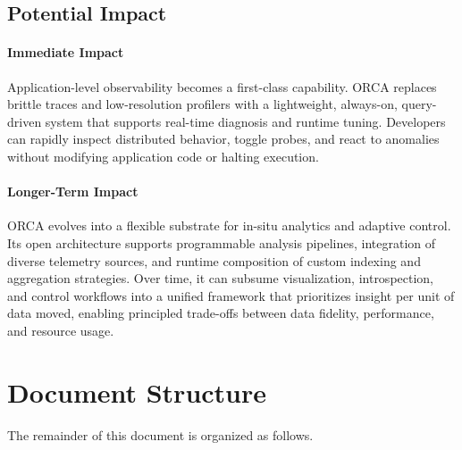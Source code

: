 \subsection{Potential Impact}

\paragraph{Immediate Impact}
Application-level observability becomes a first-class capability.
ORCA replaces brittle traces and low-resolution profilers with a lightweight, always-on,
query-driven system that supports real-time diagnosis and runtime tuning.
Developers can rapidly inspect distributed behavior, toggle probes, and react to anomalies without
modifying application code or halting execution.

\paragraph{Longer-Term Impact}
ORCA evolves into a flexible substrate for in-situ analytics and adaptive control.
Its open architecture supports programmable analysis pipelines, integration of diverse telemetry
sources, and runtime composition of custom indexing and aggregation strategies.
Over time, it can subsume visualization, introspection, and control workflows into a unified
framework that prioritizes insight per unit of data moved, enabling principled trade-offs between
data fidelity, performance, and resource usage.

\section{Document Structure}

The remainder of this document is organized as follows.

